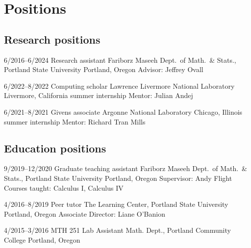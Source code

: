 \section{Positions}

\subsection{Research positions}

    \cventry
    {6/2016--6/2024}
    {Research assistant}
    {Fariborz Maseeh Dept.~of Math.~\& Stats., Portland State University}
    {Portland, Oregon}
    {}
    {Advisor: Jeffrey Ovall}

    \cventry
    {6/2022--8/2022}
    {Computing scholar}
    {Lawrence Livermore National Laboratory}
    {Livermore, California}
    {summer internship}
    {Mentor: Julian Andej}

    \cventry
    {6/2021--8/2021}
    {Givens associate}
    {Argonne National Laboratory}
    {Chicago, Illinois}
    {summer internship}
    {Mentor: Richard Tran Mills}

\subsection{Education positions}

    \cventry
    {9/2019--12/2020}
    {Graduate teaching assistant}
    {Fariborz Maseeh Dept.~of Math.~\& Stats., Portland State University}
    {Portland, Oregon}
    {}
    {Supervisor: Andy Flight\\
    Courses taught: Calculus I, Calculus IV}

    \cventry
    {4/2016--8/2019}
    {Peer tutor}
    {The Learning Center, Portland State University}
    {Portland, Oregon}
    {}
    {Associate Director: Liane O'Banion}

    \cventry
    {4/2015--3/2016}
    {MTH 251 Lab Assistant}
    {Math. Dept., Portland Community College}
    {Portland, Oregon}
    {}
    {}
